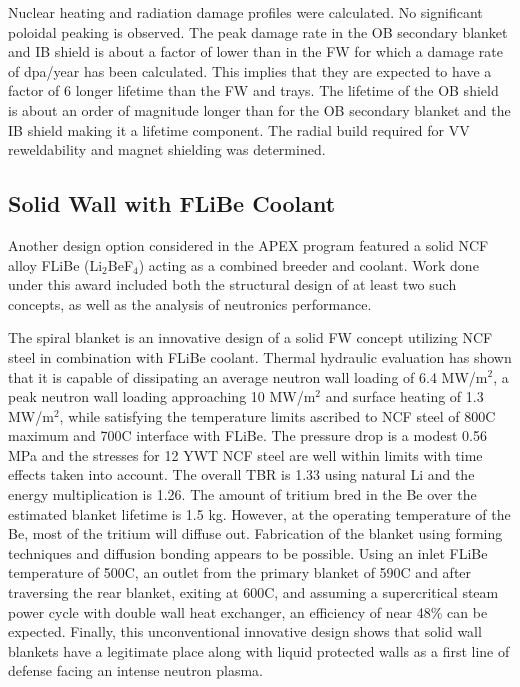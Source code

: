 Nuclear heating and radiation damage profiles were calculated. No significant
poloidal peaking is observed. The peak damage rate in the \gls{OB} secondary
blanket and \gls{IB} shield is about a factor of  lower than in
the \gls{FW} for which a damage rate of  dpa/year has been
calculated. This implies that they are expected to have a factor of 6 longer
lifetime than the \gls{FW} and trays. The lifetime of the \gls{OB} shield is
about an order of magnitude longer than for the \gls{OB} secondary blanket and
the \gls{IB} shield making it a lifetime component. The radial build required
for \gls{VV} reweldability and magnet shielding was
determined.

\subsection{Solid Wall with FLiBe Coolant}

Another design option considered in the \gls{APEX} program featured a solid
\gls{NCF} alloy FLiBe (Li$_2$BeF$_4$) acting as a combined breeder and
coolant.  Work done under this award included both the structural design of at
least two such concepts, as well as the analysis of neutronics performance.

The spiral blanket is an innovative design of a solid \gls{FW} concept
utilizing \gls{NCF} steel in combination with FLiBe coolant. Thermal hydraulic
evaluation has shown that it is capable of dissipating an average neutron wall
loading of 6.4 MW/m$^2$, a peak neutron wall loading approaching 10 MW/m$^2$
and surface heating of 1.3 MW/m$^2$, while satisfying the temperature limits
ascribed to NCF steel of 800\textdegree C maximum and 700\textdegree C interface with
FLiBe. The pressure drop is a modest 0.56 MPa and the stresses for 12 YWT
\gls{NCF} steel are well within limits with time effects taken into
account. The overall \gls{TBR} is 1.33 using natural Li and the energy
multiplication is 1.26. The amount of tritium bred in the Be over the
estimated blanket lifetime is 1.5 kg. However, at the operating temperature of
the Be, most of the tritium will diffuse out. Fabrication of the blanket using
forming techniques and diffusion bonding appears to be possible. Using an
inlet FLiBe temperature of 500\textdegree C, an outlet from the primary blanket of
590\textdegree C and after traversing the rear blanket, exiting at 600\textdegree C, and
assuming a supercritical steam power cycle with double wall heat exchanger, an
efficiency of near 48\% can be expected. Finally, this unconventional
innovative design shows that solid wall blankets have a legitimate place along
with liquid protected walls as a first line of defense facing an intense
neutron plasma.


